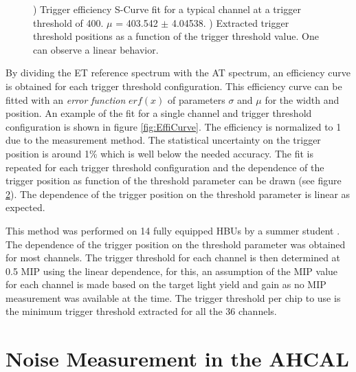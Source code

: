 \begin{figure}[htbp!]
\begin{subfigure}[t]{0.49\textwidth}
    \caption{} \label{fig:TriggerFit}
  \end{subfigure}
  \caption{) Trigger efficiency S-Curve fit for a typical channel at a trigger threshold of 400. $\mu$ = 403.542 $\pm$ 4.04538. ) Extracted trigger threshold positions as a function of the trigger threshold value. One can observe a linear behavior.}
\end{figure}

By dividing the ET reference spectrum with the AT spectrum, an efficiency curve is obtained for each trigger threshold configuration. This efficiency curve can be fitted with an \textit{error function} $erf(x)$ of parameters $\sigma$ and $\mu$ for the width and position. An example of the fit for a single channel and trigger threshold configuration is shown in figure \ref{fig:EffiCurve}. The efficiency is normalized to 1 due to the measurement method. The statistical uncertainty on the trigger position is around 1\% which is well below the needed accuracy. The fit is repeated for each trigger threshold configuration and the dependence of the trigger position as function of the threshold parameter can be drawn (see figure \ref{fig:TriggerFit}). The dependence of the trigger position on the threshold parameter is linear as expected.

This method was performed on 14 fully equipped HBUs by a summer student \cite{LloydTrigger}. The dependence of the trigger position on the threshold parameter was obtained for most channels. The trigger threshold for each channel is then determined at 0.5 MIP using the linear dependence, for this, an assumption of the MIP value for each channel is made based on the target light yield and gain as no MIP measurement was available at the time. The trigger threshold per chip to use is the minimum trigger threshold extracted for all the 36 channels.

\section{Noise Measurement in the AHCAL}

